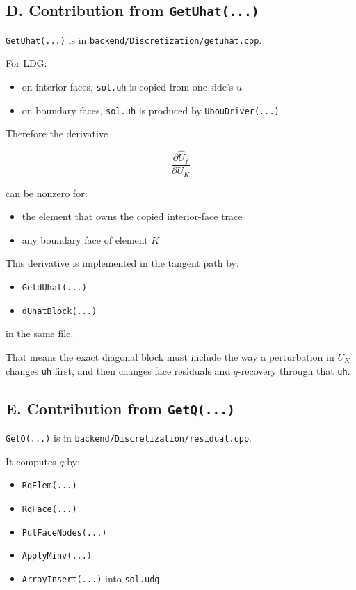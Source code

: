 \documentclass[11pt]{article}
\begin{document}
\subsection*{D. Contribution from \texttt{GetUhat(...)}}

\texttt{GetUhat(...)} is in \texttt{backend/Discretization/getuhat.cpp}.

For LDG:

\begin{itemize}[leftmargin=*]
\item on interior faces, \texttt{sol.uh} is copied from one side's $u$
\item on boundary faces, \texttt{sol.uh} is produced by \texttt{UbouDriver(...)}
\end{itemize}

Therefore the derivative

\[
\frac{\partial \hat U_f}{\partial U_K}
\]

can be nonzero for:

\begin{itemize}[leftmargin=*]
\item the element that owns the copied interior-face trace
\item any boundary face of element $K$
\end{itemize}

This derivative is implemented in the tangent path by:

\begin{itemize}[leftmargin=*]
\item \texttt{GetdUhat(...)}
\item \texttt{dUhatBlock(...)}
\end{itemize}

in the same file.

That means the exact diagonal block must include the way a perturbation in
$U_K$ changes \texttt{uh} first, and then changes face residuals and
$q$-recovery through that \texttt{uh}.

\subsection*{E. Contribution from \texttt{GetQ(...)}}

\texttt{GetQ(...)} is in \texttt{backend/Discretization/residual.cpp}.

It computes $q$ by:

\begin{itemize}[leftmargin=*]
\item \texttt{RqElem(...)}
\item \texttt{RqFace(...)}
\item \texttt{PutFaceNodes(...)}
\item \texttt{ApplyMinv(...)}
\item \texttt{ArrayInsert(...)} into \texttt{sol.udg}
\end{itemize}
\end{document}
